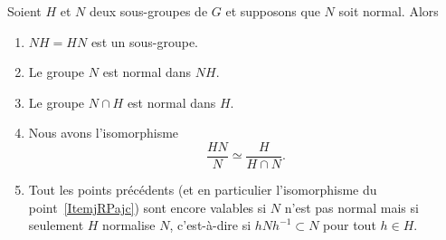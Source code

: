 \begin{theorem}
    Soient \( H\) et \( N\) deux sous-groupes de \( G\) et supposons que \( N\) soit normal. Alors
    \begin{enumerate}
        \item
            \( NH=HN\) est un sous-groupe.
        \item
            Le groupe \( N\) est normal dans \( NH\).
        \item
            Le groupe \( N\cap H\) est normal dans \( H\).

        \item\label{ItemjRPajc}
            Nous avons l'isomorphisme
            \begin{equation}
                \frac{ HN }{ N }\simeq\frac{ H }{ H\cap N }.
            \end{equation}
        \item   \label{ItembgDQEN}
            Tout les points précédents (et en particulier l'isomorphisme du point~\ref{ItemjRPajc}) sont encore valables si \( N\) n'est pas normal mais si seulement \( H\) normalise \( N\), c'est-à-dire si \( hNh^{-1}\subset N\) pour tout \( h\in H\).
    \end{enumerate}
\end{theorem}

